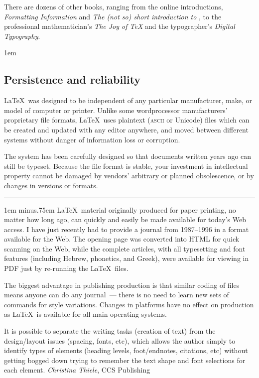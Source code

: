 \documentclass[fleqn]{article}
\begin{document}
\begin{multicols}{2}
\begin{Sbox}
\begin{minipage}{.9\columnwidth}
There are dozens of other books, ranging from the online
introductions, \textit{Formatting Information} and \textit{The (not
so) short introduction to \LaTeXe}, to the professional
mathematician's \textit{The Joy of \TeX} and the typographer's
\textit{Digital Typography}.

\end{minipage}\end{Sbox}
\fboxsep1em\noindent\shadowbox{\TheSbox}

\columnbreak
\fontsize{11}{13}\selectfont
\subsection{Persistence and reliability}

\LaTeX\ was designed to be independent of any particular manufacturer,
make, or model of computer or printer. Unlike some wordprocessor
manufacturers' proprietary file formats, \LaTeX\ uses plaintext
(\textsc{ascii} or Unicode) files which can be created and updated
with any editor anywhere, and moved between different systems without
danger of information loss or corruption.

The system has been carefully designed so that documents written years
ago can still be typeset. Because the file format is stable, your
investment in intellectual property cannot be damaged by vendors'
arbitrary or planned obsolescence, or by changes in versions or
formats.

\bigskip\hrule\medskip
\sffamily\lite\small\parindent0pt\parskip1em minus.75em
\LaTeX\ material originally produced for paper printing, no matter how
long ago, can quickly and easily be made available for today's Web
access. I have just recently had to provide a journal from 1987--1996
in a format available for the Web.  The opening page was converted
into HTML for quick scanning on the Web, while the complete articles,
with all typesetting and font features (including Hebrew, phonetics,
and Greek), were available for viewing in PDF just by re-running the
\LaTeX\ files.

The biggest advantage in publishing production is that similar
coding of files means anyone can do any journal~--- there is no
need to learn new sets of commands for style variations.
Changes in platforms have no effect on production as \LaTeX\ is
available for all main operating systems.

It is possible to separate the writing tasks (creation of text) from
the design/layout issues (spacing, fonts, etc), which allows the
author simply to identify types of elements (heading levels,
foot/endnotes, citations, etc) without getting bogged down trying to
remember the text shape and font selections for each element.\hfill
\textit{Christina Thiele}, CCS Publishing

\end{multicols}
\clearpage
\end{document}
